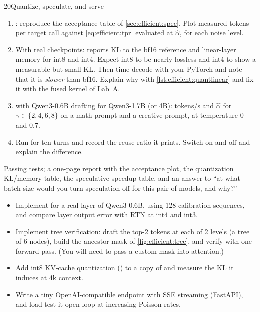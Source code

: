 \begin{labbox}{20}{Quantize, speculate, and serve}
\begin{enumerate}
  \item {}: reproduce the acceptance table of
        \cref{sec:efficient:spec}. Plot measured tokens per target call against
        \cref{eq:efficient:tpr} evaluated at $\hat\alpha$, for each noise level.
  \item With real checkpoints:  reports KL to the bf16 reference and
        linear-layer memory for int8 and int4. Expect int8 to be nearly lossless and int4 to
        show a measurable but small KL. Then time decode with your PyTorch
         and note that it is \emph{slower} than bf16. Explain why
        with \cref{lst:efficient:quantlinear} and fix it with the fused kernel of Lab~A.
  \item {} with Qwen3-0.6B drafting for Qwen3-1.7B (or 4B): tokens/s and
        $\hat\alpha$ for $\gamma\in\{2,4,6,8\}$ on a math prompt and a creative prompt, at
        temperature 0 and 0.7.
  \item Run  for ten turns and record the reuse ratio it prints.
        Switch  on and off and explain the difference.
\end{enumerate}

Passing tests; a one-page report with the acceptance plot, the quantization KL/memory
table, the speculative speedup table, and an answer to ``at what batch size would you
turn speculation off for this pair of models, and why?''

\begin{itemize}
  \item Implement  for a real layer of Qwen3-0.6B, using 128
        calibration sequences, and compare layer output error with RTN at int4 and int3.
  \item Implement tree verification: draft the top-2 tokens at each of 2 levels (a tree of
        6 nodes), build the ancestor mask of \cref{fig:efficient:tree}, and verify with one
        forward pass. (You will need to pass a custom mask into attention.)
  \item Add int8 KV-cache quantization () to a copy of
         and measure the KL it induces at 4k context.
  \item Write a tiny OpenAI-compatible  endpoint with SSE
        streaming (FastAPI), and load-test it open-loop at increasing Poisson rates.
\end{itemize}
\end{labbox}
